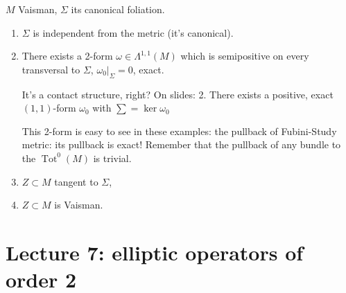 \begin{thm}\leavevmode
\(M\) Vaisman, \(\Sigma\) its canonical foliation.

\begin{enumerate}
\item \(\Sigma\) is independent from the metric (it's canonical).
\item There exists a 2-form \(\omega \in \Lambda^{1,1}(M)\) which is semipositive on every transversal to \(\Sigma\), \(\omega_0|_{\Sigma}=0\), exact.

{\color{6}It's a contact structure, right? On slides: 2. There exists a positive, exact \((1,1)\)-form \(\omega_0\) with \(\sum= \ker \omega_0\)}
	\begin{remark}\leavevmode
	This 2-form is easy to see in these examples: the pullback of Fubini-Study metric: its pullback is exact! Remember that the pullback of any bundle to the \(\operatorname{Tot}^0(M)\) is trivial.
	\end{remark}
\item  \(Z \subset M\) tangent to \(\Sigma\),
\item \(Z \subset M\) is Vaisman.
\end{enumerate}
\end{thm}

\section{Lecture 7: elliptic operators of order 2}

